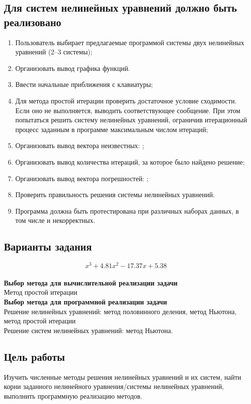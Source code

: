 \documentclass{article}
\begin{document}
\subsection{Для систем нелинейных уравнений должно быть реализовано}

\begin{enumerate}
      \item Пользователь выбирает предлагаемые программой системы двух нелинейных уравнений (2–3 системы);
      \item Организовать вывод графика функций.
      \item Ввести начальные приближения с клавиатуры;
      \item Для метода простой итерации проверить достаточное условие сходимости. Если оно не выполняется, выводить соответствующее сообщение. При этом попытаться решить систему нелинейных уравнений, ограничив итерационный процесс заданным в программе максимальным числом итераций;
      \item Организовать вывод вектора неизвестных: ;
      \item Организовать вывод количества итераций, за которое было найдено решение;
      \item Организовать вывод вектора погрешностей: ;
      \item Проверить правильность решения системы нелинейных уравнений.
      \item Программа должна быть протестирована при различных наборах данных, в том числе и некорректных.
\end{enumerate}

\subsection{Варианты задания}
      $$x^3+4.81x^2-17.37x+5.38$$
      \\
      \textbf{Выбор метода для вычислительной реализации задачи}
      \\
      Метод простой итерации
      \\
      \textbf{Выбор метода для программной реализации задачи}
      \\
      Решение нелинейных уравнений: метод половинного деления, метод Ньютона, метод простой итерации
      \\
      Решение систем нелинейных уравнений: метод Ньютона.
\subsection{Цель работы}
      Изучить численные методы решения нелинейных уравнений и их систем, найти корни заданного нелинейного уравнения/системы нелинейных уравнений, выполнить программную реализацию методов.
\end{document}
